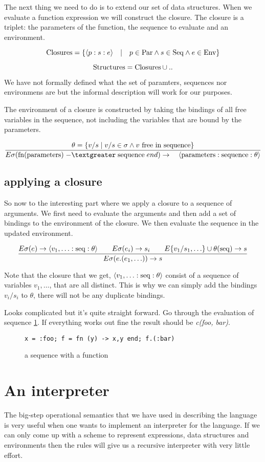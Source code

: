 \documentclass[a4paper,11pt]{article}
\begin{document}
The next thing we need to do is to extend our set of data
structures. When we evaluate a function expression we will construct
the closure. The closure is a triplet: the parameters of the function,
the sequence to evaluate and an environment.

$${\rm Closures} = \{\langle p:s:e \rangle \quad | \quad p \in {\rm Par} \wedge s \in {\rm Seq} \wedge e \in {\rm Env}\}$$

$${\rm Structures} = {\rm Closures} \cup ..$$

We have not formally defined what the set of paramters, sequences nor
environmens are but the informal description will work for our
purposes.

The environment of a closure is constructed by taking the bindings of
all free variables in the sequence, not including the variables that
are bound by the parameters.

$$\frac{ \theta = \{ v/s \mid  v/s \in \sigma \wedge v {\rm\ free\  in\ sequence}\}}{
E\sigma({\rm fn}({\rm parameters})\; {\rm -\textgreater}\; {\rm sequence}\; end )\rightarrow \quad \langle{\rm parameters}:{\rm sequence}:\theta\rangle}$$

\subsection{applying a closure}

So now to the interesting part where we apply a closure to a sequence
of arguments. We first need to evaluate the arguments and then add a
set of bindings to the environment of the closure. We then evaluate
the sequence in the updated environment.

$$\frac{E\sigma(e) \rightarrow \langle v_1, \ldots:{\rm seq}:\theta \rangle \qquad E\sigma(e_i) \rightarrow s_i \qquad E\{v_1/s_1, \ldots\}\cup\theta({\rm seq}) \rightarrow s}{E\sigma(e.(e_1, \ldots)) \rightarrow s}$$ 

Note that the closure that we get, $\langle v_1, \ldots:{\rm seq}:\theta \rangle$
consist of a sequence of variables $v_1, \ldots$, that are all
distinct. This is why we can simply add the bindings $v_i/s_i$ to
$\theta$, there will not be any duplicate bindings.

Looks complicated but it's quite straight forward. Go through the
evaluation of sequence \ref{fig:seq2}. If everything works out fine
the result should be {\em c(foo, bar)}.

\begin{figure}[ht]
\center
{\tt x = :foo; f = fn (y) -> {x,y} end;  f.(:bar)}
\caption{a sequence with a function}
\label{fig:seq2}
\end{figure}

\section{An interpreter}

The big-step operational semantics that we have used in describing the
language is very useful when one wants to implement an interpreter
for the language. If we can only come up with a scheme to represent
expressions, data structures and environments then the rules will give
us a recursive interpreter with very little effort.
\end{document}
